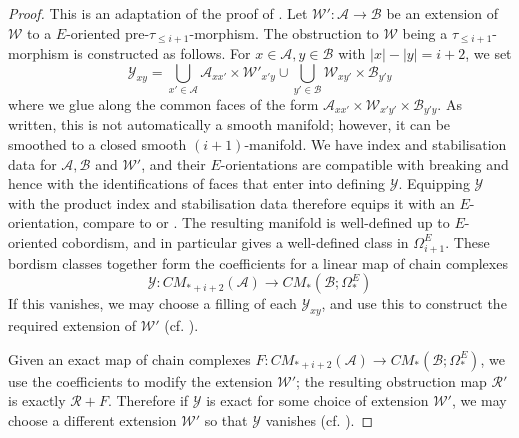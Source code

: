 \documentclass{TPmod}
\newcommand{\cA}{\mathcal{A}}
\newcommand{\cB}{\mathcal{B}}
\newcommand{\cR}{\mathcal{R}}
\newcommand{\cW}{\mathcal{W}}
\newcommand{\cY}{\mathcal{Y}}
\numberwithin{equation}{section}
\begin{document}
    \begin{proof}
        This is an adaptation of the proof of \cite[Proposition 5.38]{PS2}. Let $\cW': \cA \to \cB$ be an extension of $\cW$ to a $E$-oriented pre-$\tau_{\leq i+1}$-morphism. The obstruction to $\cW$ being a $\tau_{\leq i+1}$-morphism is constructed as follows. For $x \in \cA, y \in \cB$ with $|x|-|y|=i+2$, we set
        \begin{equation}
            \cY_{xy} = \bigcup_{x' \in \cA} \cA_{xx'} \times \cW'_{x'y} \cup \bigcup_{y' \in \cB} \cW_{xy'} \times \cB_{y'y}
        \end{equation}
        where we glue along the common faces of the form $\cA_{xx'} \times \cW_{x'y'} \times \cB_{y'y}$. As written, this is not automatically a smooth manifold; however, it can be smoothed to a closed smooth $(i+1)$-manifold. We have index and stabilisation data for $\cA, \cB$ and $\cW'$, and their $E$-orientations are compatible with breaking and hence with the identifications of faces that enter into defining $\cY$. Equipping $\cY$ with the product index and stabilisation data therefore equips it with an $E$-orientation, compare to \cite[Section 5.7]{PS2} or \cite[Section 5.5]{PS}. The resulting manifold is well-defined up to $E$-oriented cobordism, and in particular gives a well-defined class in $\Omega^{E}_{i+1}$. These bordism classes together form the coefficients for a linear map of chain complexes
        \begin{equation}
            \cY: CM_{*+i+2}(\cA) \to CM_*(\cB; \Omega^{E}_*)
        \end{equation}
        If this vanishes, we may choose a filling of each $\cY_{xy}$, and use this to construct the required extension of $\cW'$ (cf. \cite[Lemma 5.30]{PS2}). 
        
        Given an exact map of chain complexes $F: CM_{*+i+2}(\cA) \to CM_*(\cB; \Omega^{E}_*)$, we use the coefficients to modify the extension $\cW'$; the resulting obstruction map $\cR'$ is exactly $\cR+F$. Therefore if $\cY$ is exact for some choice of extension $\cW'$, we may choose a different extension $\cW'$ so that $\cY$ vanishes (cf. \cite[Lemma 5.32]{PS2}).


\end{proof}
\end{document}

